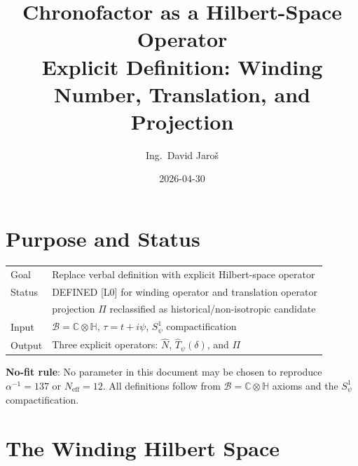\documentclass[12pt,a4paper]{article}
\title{\textbf{Chronofactor as a Hilbert-Space Operator}\\
         \large Explicit Definition: Winding Number, Translation, and Projection}
\author{Ing.\ David Jaro\v{s}}
\date{2026-04-30}
\theoremstyle{definition}
\theoremstyle{remark}
\begin{document}
  \maketitle
\fi

\section{Purpose and Status}
\label{sec:chron:purpose}

\begin{tcolorbox}[colback=blue!4!white, colframe=blue!50!black,
                  title=Chronofactor — Operator Formulation]
\begin{tabular}{ll}
Goal    & Replace verbal definition with explicit Hilbert-space operator \\
Status  & DEFINED [L0] for winding operator and translation operator \\
        & projection $\Pi$ reclassified as historical/non-isotropic candidate \\
Input   & $\mathcal{B}=\mathbb{C}\otimes\mathbb{H}$, $\tau=t+i\psi$, $S^1_\psi$ compactification \\
Output  & Three explicit operators: $\hat{N}$, $\hat{T}_\psi(\delta)$, and $\Pi$ \\
\end{tabular}
\end{tcolorbox}

\begin{warnbox}
\textbf{No-fit rule}: No parameter in this document may be chosen to reproduce
$\alpha^{-1} = 137$ or $N_{\mathrm{eff}} = 12$.  All definitions follow from
$\mathcal{B} = \mathbb{C}\otimes\mathbb{H}$ axioms and the $S^1_\psi$ compactification.
\end{warnbox}

\section{The Winding Hilbert Space}
\label{sec:chron:hilbert}
\end{document}
